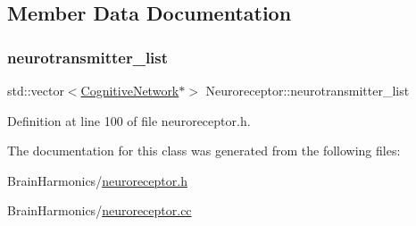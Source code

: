 \subsection{Member Data Documentation}
\mbox{\label{class_neuroreceptor_aeb769732421531614a47bcab8ae21f8e}} 
\subsubsection{\texorpdfstring{neurotransmitter\+\_\+list}{neurotransmitter\_list}}
{\footnotesize\ttfamily std\+::vector$<$\mbox{\hyperlink{class_cognitive_network}{Cognitive\+Network}}$\ast$$>$ Neuroreceptor\+::neurotransmitter\+\_\+list\hspace{0.3cm}{\ttfamily [protected]}}



Definition at line 100 of file neuroreceptor.\+h.



The documentation for this class was generated from the following files\+:\begin{DoxyCompactItemize}
\item 
Brain\+Harmonics/\mbox{\hyperlink{neuroreceptor_8h}{neuroreceptor.\+h}}\item 
Brain\+Harmonics/\mbox{\hyperlink{neuroreceptor_8cc}{neuroreceptor.\+cc}}\end{DoxyCompactItemize}
